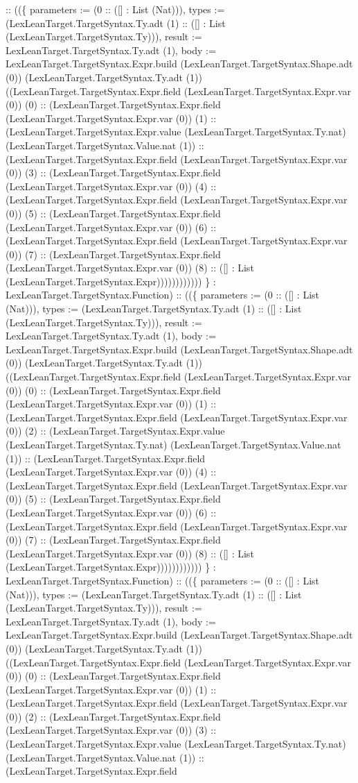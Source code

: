 \documentclass[11pt]{article}
\begin{document}
:: ((\{ parameters := (0 :: ([] : List (Nat))), types := (LexLeanTarget.TargetSyntax.Ty.adt (1) :: ([] : List (LexLeanTarget.TargetSyntax.Ty))), result := LexLeanTarget.TargetSyntax.Ty.adt (1), body := LexLeanTarget.TargetSyntax.Expr.build (LexLeanTarget.TargetSyntax.Shape.adt (0)) (LexLeanTarget.TargetSyntax.Ty.adt (1)) ((LexLeanTarget.TargetSyntax.Expr.field (LexLeanTarget.TargetSyntax.Expr.var (0)) (0) :: (LexLeanTarget.TargetSyntax.Expr.field (LexLeanTarget.TargetSyntax.Expr.var (0)) (1) :: (LexLeanTarget.TargetSyntax.Expr.value (LexLeanTarget.TargetSyntax.Ty.nat) (LexLeanTarget.TargetSyntax.Value.nat (1)) :: (LexLeanTarget.TargetSyntax.Expr.field (LexLeanTarget.TargetSyntax.Expr.var (0)) (3) :: (LexLeanTarget.TargetSyntax.Expr.field (LexLeanTarget.TargetSyntax.Expr.var (0)) (4) :: (LexLeanTarget.TargetSyntax.Expr.field (LexLeanTarget.TargetSyntax.Expr.var (0)) (5) :: (LexLeanTarget.TargetSyntax.Expr.field (LexLeanTarget.TargetSyntax.Expr.var (0)) (6) :: (LexLeanTarget.TargetSyntax.Expr.field (LexLeanTarget.TargetSyntax.Expr.var (0)) (7) :: (LexLeanTarget.TargetSyntax.Expr.field (LexLeanTarget.TargetSyntax.Expr.var (0)) (8) :: ([] : List (LexLeanTarget.TargetSyntax.Expr)))))))))))) \} : LexLeanTarget.TargetSyntax.Function) :: ((\{ parameters := (0 :: ([] : List (Nat))), types := (LexLeanTarget.TargetSyntax.Ty.adt (1) :: ([] : List (LexLeanTarget.TargetSyntax.Ty))), result := LexLeanTarget.TargetSyntax.Ty.adt (1), body := LexLeanTarget.TargetSyntax.Expr.build (LexLeanTarget.TargetSyntax.Shape.adt (0)) (LexLeanTarget.TargetSyntax.Ty.adt (1)) ((LexLeanTarget.TargetSyntax.Expr.field (LexLeanTarget.TargetSyntax.Expr.var (0)) (0) :: (LexLeanTarget.TargetSyntax.Expr.field (LexLeanTarget.TargetSyntax.Expr.var (0)) (1) :: (LexLeanTarget.TargetSyntax.Expr.field (LexLeanTarget.TargetSyntax.Expr.var (0)) (2) :: (LexLeanTarget.TargetSyntax.Expr.value (LexLeanTarget.TargetSyntax.Ty.nat) (LexLeanTarget.TargetSyntax.Value.nat (1)) :: (LexLeanTarget.TargetSyntax.Expr.field (LexLeanTarget.TargetSyntax.Expr.var (0)) (4) :: (LexLeanTarget.TargetSyntax.Expr.field (LexLeanTarget.TargetSyntax.Expr.var (0)) (5) :: (LexLeanTarget.TargetSyntax.Expr.field (LexLeanTarget.TargetSyntax.Expr.var (0)) (6) :: (LexLeanTarget.TargetSyntax.Expr.field (LexLeanTarget.TargetSyntax.Expr.var (0)) (7) :: (LexLeanTarget.TargetSyntax.Expr.field (LexLeanTarget.TargetSyntax.Expr.var (0)) (8) :: ([] : List (LexLeanTarget.TargetSyntax.Expr)))))))))))) \} : LexLeanTarget.TargetSyntax.Function) :: ((\{ parameters := (0 :: ([] : List (Nat))), types := (LexLeanTarget.TargetSyntax.Ty.adt (1) :: ([] : List (LexLeanTarget.TargetSyntax.Ty))), result := LexLeanTarget.TargetSyntax.Ty.adt (1), body := LexLeanTarget.TargetSyntax.Expr.build (LexLeanTarget.TargetSyntax.Shape.adt (0)) (LexLeanTarget.TargetSyntax.Ty.adt (1)) ((LexLeanTarget.TargetSyntax.Expr.field (LexLeanTarget.TargetSyntax.Expr.var (0)) (0) :: (LexLeanTarget.TargetSyntax.Expr.field (LexLeanTarget.TargetSyntax.Expr.var (0)) (1) :: (LexLeanTarget.TargetSyntax.Expr.field (LexLeanTarget.TargetSyntax.Expr.var (0)) (2) :: (LexLeanTarget.TargetSyntax.Expr.field (LexLeanTarget.TargetSyntax.Expr.var (0)) (3) :: (LexLeanTarget.TargetSyntax.Expr.value (LexLeanTarget.TargetSyntax.Ty.nat) (LexLeanTarget.TargetSyntax.Value.nat (1)) :: (LexLeanTarget.TargetSyntax.Expr.field 
\end{document}
